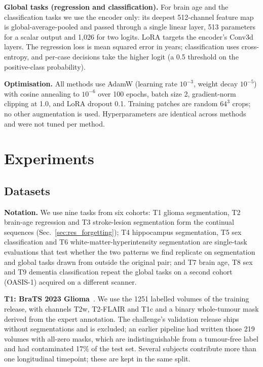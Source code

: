 \iffull\documentclass[journal]{IEEEtran}\else\documentclass[journal,twoside,web]{ieeecolor}\usepackage{generic}\fi
\begin{document}
\textbf{Global tasks (regression and classification).} For brain age and the classification tasks we use the encoder only: its deepest 512-channel feature map is global-average-pooled and passed through a single linear layer, 513 parameters for a scalar output and 1,026 for two logits. LoRA targets the encoder's Conv3d layers. The regression loss is mean squared error in years; classification uses cross-entropy, and per-case decisions take the higher logit (a 0.5 threshold on the positive-class probability).

\textbf{Optimisation.} All methods use AdamW (learning rate $10^{-3}$, weight decay $10^{-5}$) with cosine annealing to $10^{-6}$ over 100 epochs, batch size 2, gradient-norm clipping at 1.0, and LoRA dropout 0.1. Training patches are random $64^3$ crops; no other augmentation is used. Hyperparameters are identical across methods and were not tuned per method.

\section{Experiments}
\label{sec:experiments}

\subsection{Datasets}
\label{sec:data}

\textbf{Notation.} We use nine tasks from six cohorts: T1 glioma segmentation, T2 brain-age regression and T3 stroke-lesion segmentation form the continual sequences (Sec.~\ref{sec:res_forgetting}); T4 hippocampus segmentation, T5 sex classification and T6 white-matter-hyperintensity segmentation are single-task evaluations that test whether the two patterns we find replicate on segmentation and global tasks drawn from outside the original pair; and T7 brain age, T8 sex and T9 dementia classification repeat the global tasks on a second cohort (OASIS-1) acquired on a different scanner.

\textbf{T1: BraTS 2023 Glioma}~\cite{brats2023,menze2015brats}. We use the 1251 labelled volumes of the training release, with channels T2w, T2-FLAIR and T1c and a binary whole-tumour mask derived from the expert annotation. The challenge's validation release ships without segmentations and is excluded; an earlier pipeline had written those 219 volumes with all-zero masks, which are indistinguishable from a tumour-free label and had contaminated 17\% of the test set. Several subjects contribute more than one longitudinal timepoint; these are kept in the same split.
\end{document}
